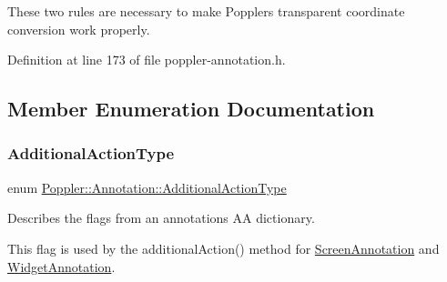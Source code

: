 These two rules are necessary to make Poppler\textquotesingle{}s transparent coordinate conversion work properly. 

Definition at line 173 of file poppler-\/annotation.\+h.



\subsection{Member Enumeration Documentation}
\mbox{\label{class_poppler_1_1_annotation_adab1fa85588b8f9fcdf20cdf37c1be97}} 
\subsubsection{\texorpdfstring{Additional\+Action\+Type}{AdditionalActionType}}
{\footnotesize\ttfamily enum \hyperlink{class_poppler_1_1_annotation_adab1fa85588b8f9fcdf20cdf37c1be97}{Poppler\+::\+Annotation\+::\+Additional\+Action\+Type}}

Describes the flags from an annotations \textquotesingle{}AA\textquotesingle{} dictionary.

This flag is used by the additional\+Action() method for \hyperlink{class_poppler_1_1_screen_annotation}{Screen\+Annotation} and \hyperlink{class_poppler_1_1_widget_annotation}{Widget\+Annotation}.

